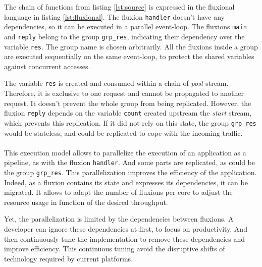 The chain of functions from listing \ref{lst:source} is expressed in the fluxional language in listing \ref{lst:fluxional}.
The fluxion \texttt{handler} doesn't have any dependencies, so it can be executed in a parallel event-loop.
The fluxions \texttt{main} and \texttt{reply} belong to the group \texttt{grp\_res}, indicating their dependency over the variable \texttt{res}.
The group name is chosen arbitrarily.
All the fluxions inside a group are executed sequentially on the same event-loop, to protect the shared variables against concurrent accesses.

The variable \texttt{res} is created and consumed within a chain of \textit{post} stream.
Therefore, it is exclusive to one request and cannot be propagated to another request.
It doesn't prevent the whole group from being replicated.
However, the fluxion \texttt{reply} depends on the variable \texttt{count} created upstream the \textit{start} stream, which prevents this replication.
If it did not rely on this state, the group \texttt{grp\_res} would be stateless, and could be replicated to cope with the incoming traffic.

\paragraph{}

This execution model allows to parallelize the execution of an application as a pipeline, as with the fluxion \texttt{handler}.
And some parts are replicated, as could be the group \texttt{grp\_res}.
This parallelization improves the efficiency of the application.
Indeed, as a fluxion contains its state and expresses its dependencies, it can be migrated.
It allows to adapt the number of fluxions per core to adjust the resource usage in function of the desired throughput.

Yet, the parallelization is limited by the dependencies between fluxions.
A developer can ignore these dependencies at first, to focus on productivity.
And then continuously tune the implementation to remove these dependencies and improve efficiency.
This continuous tuning avoid the disruptive shifts of technology required by current platforms.